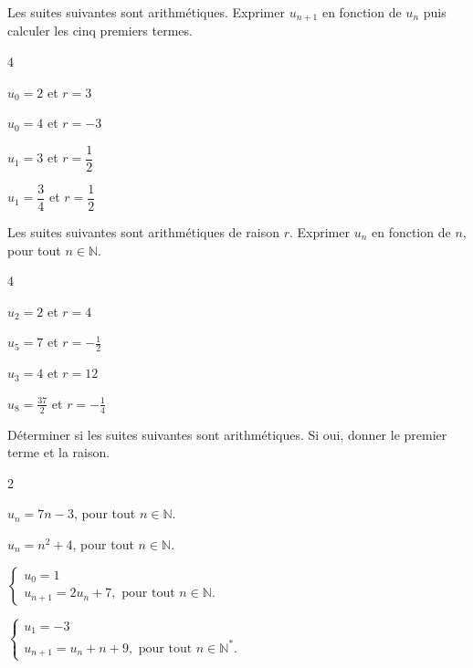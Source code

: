 \documentclass[11pt,a4paper]{article}  %
\begin{document}
Les suites suivantes sont arithmétiques. Exprimer $u_{n+1}$ en fonction de $u_n$ puis calculer les cinq premiers termes.
\begin{multicols}{4}
	\begin{enumMet}
	\item $u_0=2$ et $r=3$
	\item $u_0=4$ et $r=-3$
	\item $u_1=3$ et $r=\dfrac{1}{2}$
	\item $u_1=\dfrac{3}{4}$ et $r=\dfrac{1}{2}$
\end{enumMet}
\end{multicols}


Les suites suivantes sont arithmétiques de raison $r$. Exprimer $u_n$ en fonction de $n$, pour tout $n \in \mathbb{N}$.
\begin{multicols}{4}
	\begin{enumMet}
	\item $u_2=2$ et $r=4$
	\item $u_5=7$ et $r=-\frac{1}{2}$
	\item $u_3=4$ et $r=12$
	\item $u_8=\frac{37}{2}$ et $r=-\frac{1}{4}$
\end{enumMet}
\end{multicols}


Déterminer si les suites suivantes sont arithmétiques. Si oui, donner le premier terme et la raison.
\begin{multicols}{2}
	\begin{enumMet}
	\item $u_n=7 n-3$, pour tout $n \in \mathbb{N}$.
	\item $u_n=n^2+4$, pour tout $n \in \mathbb{N}$.
	\item $\left\{\begin{array}{l}u_0=1 \\ u_{n+1}=2 u_n+7, \text { pour tout } n \in \mathbb{N} \text {. }\end{array}\right.$
	\item $\left\{\begin{array}{l}u_1=-3 \\ u_{n+1}=u_n+n+9, \text { pour tout } n \in \mathbb{N}^* .\end{array}\right.$
\end{enumMet}
\end{multicols}
\end{document}
